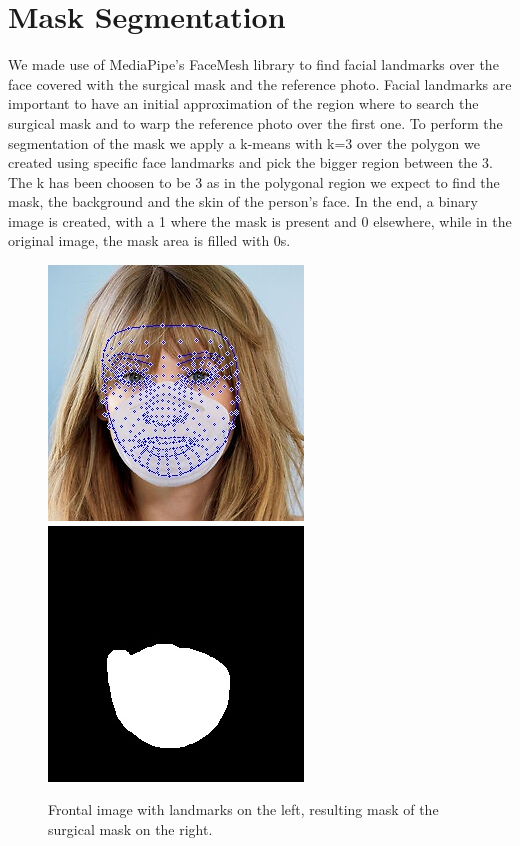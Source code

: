\documentclass[10pt,twocolumn,letterpaper]{article}
\begin{document}
\section{Mask Segmentation}
We made use of MediaPipe's FaceMesh \cite{DBLP:journals/corr/abs-1907-06724}
library to find facial landmarks over the face covered with the surgical mask
and the reference photo. Facial landmarks are important to have an initial
approximation of the region where to search the surgical mask and to warp the
reference photo over the first one. To perform the segmentation of the mask we
apply a k-means with k=3 over the polygon we created using specific face landmarks and
pick the bigger region between the 3.  The k has been choosen to be 3 as in the
polygonal region we expect to find the mask, the background and the skin of the
person's face. In the end, a binary image is created, with a 1 where the mask is
present and 0 elsewhere, while in the original image, the mask area is filled
with 0s.
\begin{figure}
  \caption{Frontal image with landmarks on the left, resulting mask of the surgical mask on the right.}
  \includegraphics[width=0.49\linewidth]{img/landmarks_front.jpeg}
  \includegraphics[width=0.49\linewidth]{img/dilated.jpeg}
\end{figure}
\end{document}
